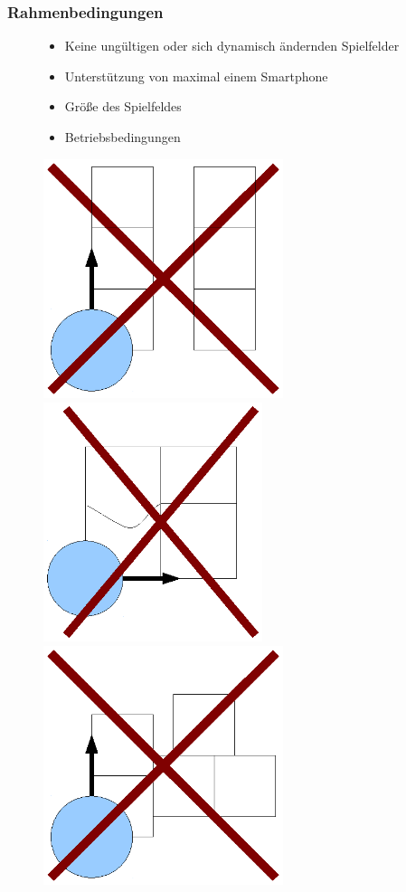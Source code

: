 \documentclass{beamer}
\begin{document}
\begin{frame}
  \frametitle{Rahmenbedingungen}
		\begin{figure}[htbp]
			\begin{minipage}[]{7cm}
				\begin{itemize}
					\vspace{0pt}
					\item Keine ungültigen oder sich dynamisch ändernden Spielfelder
					\item Unterstützung von maximal einem Smartphone
					\item Größe des Spielfeldes
					\item Betriebsbedingungen
				\end{itemize} 
			\end{minipage}
			\begin{minipage}[t]{21cm}
				\vspace{30pt}
				\includegraphics[height=7cm]{images/ungueltig1.eps}
				\includegraphics[height=7cm]{images/ungueltig2.eps} 
				\includegraphics[height=7cm]{images/ungueltig3.eps} 
			\end{minipage}
   		\end{figure}
		

\end{frame}
\end{document}
